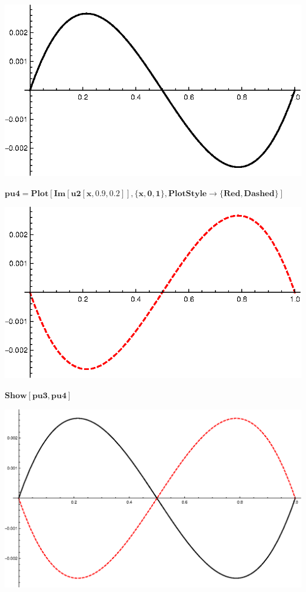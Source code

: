 {\includegraphics{chapters/appendices/KP_Mathematica/Kronig_Penney_model_transfer_matrix_gr11.eps}

\begin{doublespace}
\noindent\(\pmb{\text{pu4}=\text{Plot}[\text{Im}[\text{u2}[x,0.9,0.2]],\{x,0,1\},\text{PlotStyle}\to \{\text{Red},\text{Dashed}\}]}\)
\end{doublespace}

\includegraphics{chapters/appendices/KP_Mathematica/Kronig_Penney_model_transfer_matrix_gr12.eps}

\begin{doublespace}
\noindent\(\pmb{\text{Show}[\text{pu3},\text{pu4}]}\)
\end{doublespace}

\includegraphics[width=\textwidth]{chapters/appendices/KP_Mathematica/Kronig_Penney_model_transfer_matrix_gr13.eps}

}
